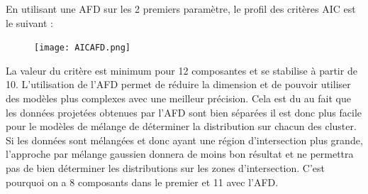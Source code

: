 \documentclass[12pt]{scrartcl} %
\begin{document}
En utilisant une AFD sur les 2 premiers paramètre, le profil des critères AIC est le suivant : 
\newline
\begin{figure}[!h]
 \centering 
\texttt{[image: AICAFD.png]}
\end{figure}
\newline 
La valeur du critère est minimum pour 12 composantes et se stabilise à partir de 10. L'utilisation de l'AFD permet de réduire la dimension et de pouvoir utiliser des modèles plus complexes avec une meilleur précision. Cela est du au fait que les données projetées obtenues par l'AFD sont bien séparées il est donc plus facile pour le modèles de mélange de déterminer la distribution sur chacun des cluster. Si les données sont mélangées et donc ayant une région d'intersection plus grande, l'approche par mélange gaussien donnera de moins bon résultat et ne permettra pas de bien déterminer les distributions sur les zones d'intersection. C'est pourquoi on a 8 composants dans le premier et 11 avec l'AFD.
\end{document}
